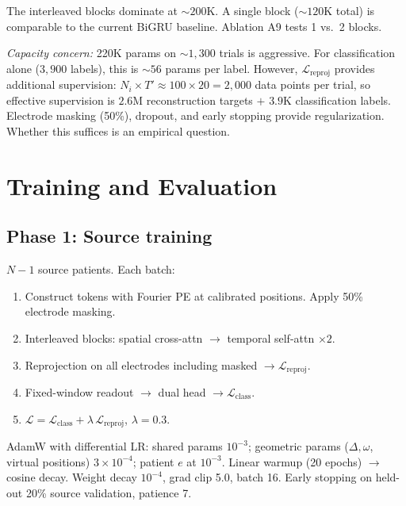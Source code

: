 \documentclass[11pt,letterpaper]{article}
\begin{document}
The interleaved blocks dominate at ${\sim}200$K. A single block (${\sim}120$K total) is comparable to the current BiGRU baseline. Ablation A9 tests 1 vs.\ 2 blocks.

\textcolor{BrickRed}{\textit{Capacity concern:}} 220K params on ${\sim}1{,}300$ trials is aggressive. For classification alone ($3{,}900$ labels), this is ${\sim}56$ params per label. However, $\mathcal{L}_{\text{reproj}}$ provides additional supervision: $N_i \times T' \approx 100 \times 20 = 2{,}000$ data points per trial, so effective supervision is $2.6$M reconstruction targets $+$ $3.9$K classification labels. Electrode masking (50\%), dropout, and early stopping provide regularization. Whether this suffices is an empirical question.



\section{Training and Evaluation}\label{sec:training}

\subsection{Phase 1: Source training}

$N{-}1$ source patients. Each batch:
\begin{enumerate}[leftmargin=2em]
\item Construct tokens with Fourier PE at calibrated positions. Apply 50\% electrode masking.
\item Interleaved blocks: spatial cross-attn $\to$ temporal self-attn $\times 2$.
\item Reprojection on all electrodes including masked $\to \mathcal{L}_{\text{reproj}}$.
\item Fixed-window readout $\to$ dual head $\to \mathcal{L}_{\text{class}}$.
\item $\mathcal{L} = \mathcal{L}_{\text{class}} + \lambda \,\mathcal{L}_{\text{reproj}}$, $\lambda = 0.3$.
\end{enumerate}

AdamW with differential LR: shared params $10^{-3}$; geometric params ($\Delta, \omega$, virtual positions) $3 {\times} 10^{-4}$; patient $e$ at $10^{-3}$. Linear warmup (20 epochs) $\to$ cosine decay. Weight decay $10^{-4}$, grad clip 5.0, batch 16. Early stopping on held-out 20\% source validation, patience 7.
\end{document}
